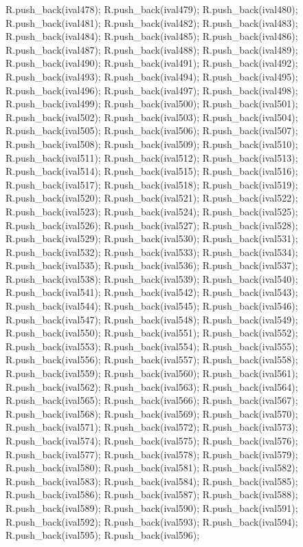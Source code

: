 \begin{DoxyCode}
{R.push_back(ival478);
R.push_back(ival479);
R.push_back(ival480);
R.push_back(ival481);
R.push_back(ival482);
R.push_back(ival483);
R.push_back(ival484);
R.push_back(ival485);
R.push_back(ival486);
R.push_back(ival487);
R.push_back(ival488);
R.push_back(ival489);
R.push_back(ival490);
R.push_back(ival491);
R.push_back(ival492);
R.push_back(ival493);
R.push_back(ival494);
R.push_back(ival495);
R.push_back(ival496);
R.push_back(ival497);
R.push_back(ival498);
R.push_back(ival499);
R.push_back(ival500);
R.push_back(ival501);
R.push_back(ival502);
R.push_back(ival503);
R.push_back(ival504);
R.push_back(ival505);
R.push_back(ival506);
R.push_back(ival507);
R.push_back(ival508);
R.push_back(ival509);
R.push_back(ival510);
R.push_back(ival511);
R.push_back(ival512);
R.push_back(ival513);
R.push_back(ival514);
R.push_back(ival515);
R.push_back(ival516);
R.push_back(ival517);
R.push_back(ival518);
R.push_back(ival519);
R.push_back(ival520);
R.push_back(ival521);
R.push_back(ival522);
R.push_back(ival523);
R.push_back(ival524);
R.push_back(ival525);
R.push_back(ival526);
R.push_back(ival527);
R.push_back(ival528);
R.push_back(ival529);
R.push_back(ival530);
R.push_back(ival531);
R.push_back(ival532);
R.push_back(ival533);
R.push_back(ival534);
R.push_back(ival535);
R.push_back(ival536);
R.push_back(ival537);
R.push_back(ival538);
R.push_back(ival539);
R.push_back(ival540);
R.push_back(ival541);
R.push_back(ival542);
R.push_back(ival543);
R.push_back(ival544);
R.push_back(ival545);
R.push_back(ival546);
R.push_back(ival547);
R.push_back(ival548);
R.push_back(ival549);
R.push_back(ival550);
R.push_back(ival551);
R.push_back(ival552);
R.push_back(ival553);
R.push_back(ival554);
R.push_back(ival555);
R.push_back(ival556);
R.push_back(ival557);
R.push_back(ival558);
R.push_back(ival559);
R.push_back(ival560);
R.push_back(ival561);
R.push_back(ival562);
R.push_back(ival563);
R.push_back(ival564);
R.push_back(ival565);
R.push_back(ival566);
R.push_back(ival567);
R.push_back(ival568);
R.push_back(ival569);
R.push_back(ival570);
R.push_back(ival571);
R.push_back(ival572);
R.push_back(ival573);
R.push_back(ival574);
R.push_back(ival575);
R.push_back(ival576);
R.push_back(ival577);
R.push_back(ival578);
R.push_back(ival579);
R.push_back(ival580);
R.push_back(ival581);
R.push_back(ival582);
R.push_back(ival583);
R.push_back(ival584);
R.push_back(ival585);
R.push_back(ival586);
R.push_back(ival587);
R.push_back(ival588);
R.push_back(ival589);
R.push_back(ival590);
R.push_back(ival591);
R.push_back(ival592);
R.push_back(ival593);
R.push_back(ival594);
R.push_back(ival595);
R.push_back(ival596);
}
\end{DoxyCode}
